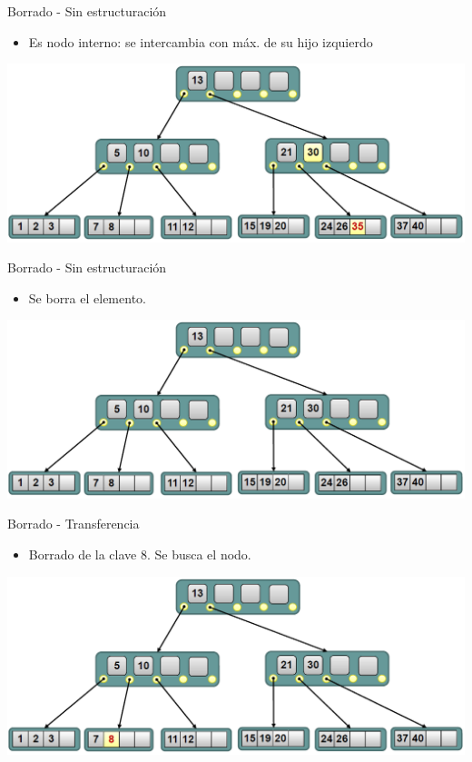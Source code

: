 \documentclass[handout]{beamer} %
\newcommand{\redb}[1]{{\color{red!70!black}{#1}}}
\begin{document}
\begin{frame}{Borrado - Sin estructuración}
    \begin{itemize}
        \item Es nodo interno: se intercambia con máx. de su hijo izquierdo
    \end{itemize}
    \begin{center}
        \includegraphics[width=\textwidth]{./image/cap3/b-tree-delete2}
    \end{center}
\end{frame}

\begin{frame}{Borrado - Sin estructuración}
    \begin{itemize}
        \item Se borra el elemento. \redb{Fin}
    \end{itemize}
    \begin{center}
        \includegraphics[width=\textwidth]{./image/cap3/b-tree-delete3}
    \end{center}
\end{frame}

\begin{frame}{Borrado - Transferencia}
    \begin{itemize}
        \item Borrado de la clave 8. Se busca el nodo.
    \end{itemize}
    \begin{center}
        \includegraphics[width=\textwidth]{./image/cap3/b-tree-delete4}
    \end{center}
\end{frame}
\end{document}
